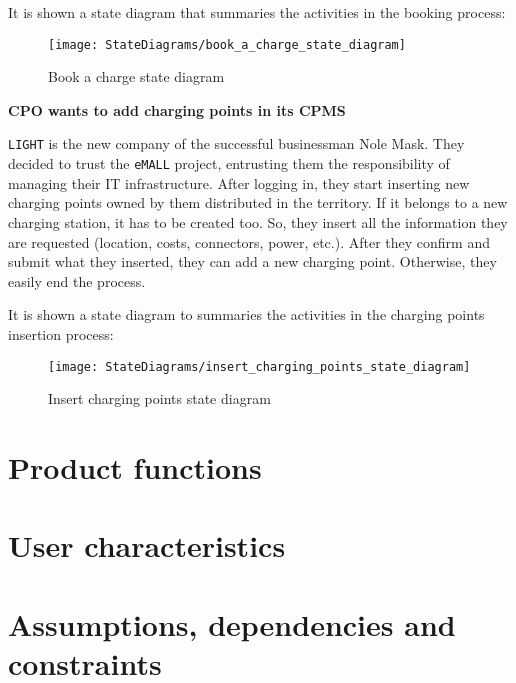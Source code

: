 It is shown a state diagram that summaries the activities in the booking process:
\begin{figure}[H]
    \centering
    \texttt{[image: StateDiagrams/book\_a\_charge\_state\_diagram]}
    \caption{Book a charge state diagram}
    \label{fig: booking_sd}
\end{figure}

\textbf{CPO wants to add charging points in its CPMS}

\verb|LIGHT| is the new company of the successful businessman Nole Mask.
They decided to trust the \verb|eMALL| project, entrusting them the responsibility of managing their IT infrastructure.
After logging in, they start inserting new charging points owned by them distributed in the territory.
If it belongs to a new charging station, it has to be created too.
So, they insert all the information they are requested (location, costs, connectors, power, etc.).
After they confirm and submit what they inserted, they can add a new charging point.
Otherwise, they easily end the process.

It is shown a state diagram to summaries the activities in the charging points insertion process:
\begin{figure}[H]
    \centering
    \texttt{[image: StateDiagrams/insert\_charging\_points\_state\_diagram]}
    \caption{Insert charging points state diagram}
    \label{fig: insert_charging_points_sd}
\end{figure}

\section{Product functions}\label{sec:product_functions}


\section{User characteristics}\label{sec:user_characteristics}


\section{Assumptions, dependencies and constraints}\label{sec:assumptions_dependencies_and_constraints}
